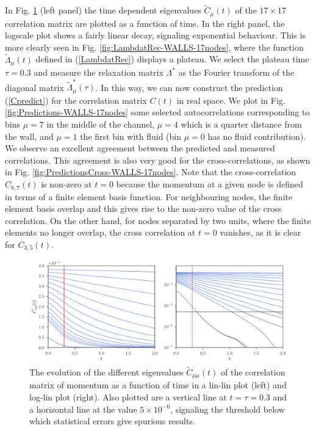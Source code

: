 \documentclass[b5paper,openright,11pt]{book}
\begin{document}
In  Fig.
\ref{fig:CtRec-WALLS-17nodes-exp}   (left   panel)   the   time   dependent   eigenvalues
$\tilde{C}_{\mu}(t)$  of  the  $17\times 17$  correlation  matrix  are
plotted as a function of time.  In the right panel, the logscale plot
shows a fairly linear decay, signaling exponential behaviour.  This is
more  clearly   seen  in   Fig. \ref{fig:LambdatRec-WALLS-17nodes},  where   the  function
$\tilde{\Lambda}_\mu(t)$  defined  in  (\ref{LambdatRec})  displays  a
plateau.   We select  the  plateau time  $\tau=0.3$  and measure  the
relaxation matrix $\Lambda^*$ as the Fourier transform of the diagonal
matrix  $\tilde{\Lambda}_{\mu}^*(\tau)$.   In  this way,  we  can  now
construct the  prediction (\ref{Cpredict}) for the  correlation matrix
$C(t)$ in real space. We  plot in Fig.  \ref{fig:Predictions-WALLS-17nodes} some selected
autocorrelations corresponding  to bins $\mu=7$  in the middle  of the
channel,  $\mu=4$ which  is  a  quarter distance  from  the wall,  and
$\mu=1$  the  first   bin  with  fluid  (bin  $\mu=0$   has  no  fluid
contribution).   We   observe  an  excellent  agreement   between  the
predicted and measured correlations.  This agreement is also very good
for the  cross-correlations, as shown in  Fig. \ref{fig:PredictionsCross-WALLS-17nodes}. Note
that the  cross-correlation $C_{8,7}(t)$ is non-zero  at $t=0$ because
the momentum at a  given node is defined in terms  of a finite element
basis  function.  For neighbouring  nodes,  the  finite element  basis
overlap  and this  gives  rise  to the  non-zero  value  of the  cross
correlation.  On  the other  hand, for nodes  separated by  two units,
where the finite elements no  longer overlap, the cross correlation at
$t=0$ vanishes, as it is clear for $C_{3,5}(t)$.



\begin{figure}[h!]
  \centering
  \includegraphics[width=\linewidth]{CtRec-WALLS-17nodes-exp}
  \caption[Evolution of different eigenvalues $\tilde{C}_{\mu\nu}(t)$ for confined fluid - 17 nodes.]{
  The  evolution of  the different
  eigenvalues  $\tilde{C}_{\mu\mu}(t)$ of  the  correlation matrix  of
  momentum  as  a  function  of   time  in  a  lin-lin  plot  (left)
  and   log-lin   plot
  (right). Also  plotted are  a vertical line  at $t=\tau=0.3$  and a
  horizontal  line  at  the   value  $5\times10^{-6}$,  signaling  the
  threshold below which statistical errors give spurious results. }
\label{fig:CtRec-WALLS-17nodes-exp}
\end{figure}
\end{document}
